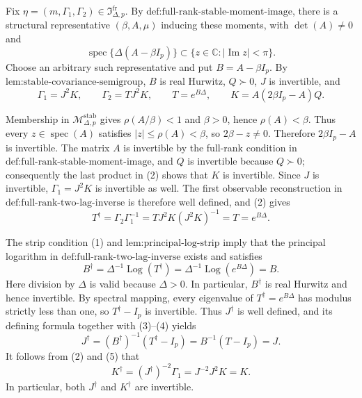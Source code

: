 Fix \(\eta=(m,\Gamma_1,\Gamma_2)\in\mathfrak I_{\Delta,p}^{\mathrm{fr}}\).  By \(\text{def:full-rank-stable-moment-image}\), there is a structural representative \((\beta,A,\mu)\) inducing these moments, with \(\det(A)\neq0\) and
\[
 \operatorname{spec}\{\Delta(A-\beta I_p)\}
 \subset\{z\in\mathbb C:|\operatorname{Im}z|<\pi\}.
\tag{1}
\]
Choose an arbitrary such representative and put \(B=A-\beta I_p\).  By \(\text{lem:stable-covariance-semigroup}\), \(B\) is real Hurwitz, \(Q\succ0\), \(J\) is invertible, and
\[
 \Gamma_1=J^2K,\qquad
 \Gamma_2=TJ^2K,\qquad
 T=e^{B\Delta},\qquad
 K=A(2\beta I_p-A)Q.
\tag{2}
\]

Membership in \(\mathcal M_{\Delta,p}^{\mathrm{stab}}\) gives \(\rho(A/\beta)<1\) and \(\beta>0\), hence \(\rho(A)<\beta\).  Thus every \(z\in\operatorname{spec}(A)\) satisfies \(|z|\leq\rho(A)<\beta\), so \(2\beta-z\neq0\).  Therefore \(2\beta I_p-A\) is invertible.  The matrix \(A\) is invertible by the full-rank condition in \(\text{def:full-rank-stable-moment-image}\), and \(Q\) is invertible because \(Q\succ0\); consequently the last product in (2) shows that \(K\) is invertible.  Since \(J\) is invertible, \(\Gamma_1=J^2K\) is invertible as well.  The first observable reconstruction in \(\text{def:full-rank-two-lag-inverse}\) is therefore well defined, and (2) gives
\[
 T^\dagger
 =\Gamma_2\Gamma_1^{-1}
 =TJ^2K(J^2K)^{-1}
 =T=e^{B\Delta}.
\tag{3}
\]

The strip condition (1) and \(\text{lem:principal-log-strip}\) imply that the principal logarithm in \(\text{def:full-rank-two-lag-inverse}\) exists and satisfies
\[
 B^\dagger
 =\Delta^{-1}\operatorname{Log}(T^\dagger)
 =\Delta^{-1}\operatorname{Log}(e^{B\Delta})
 =B.
\tag{4}
\]
Here division by \(\Delta\) is valid because \(\Delta>0\).  In particular, \(B^\dagger\) is real Hurwitz and hence invertible.  By spectral mapping, every eigenvalue of \(T^\dagger=e^{B\Delta}\) has modulus strictly less than one, so \(T^\dagger-I_p\) is invertible.  Thus \(J^\dagger\) is well defined, and its defining formula together with (3)--(4) yields
\[
 J^\dagger
 =(B^\dagger)^{-1}(T^\dagger-I_p)
 =B^{-1}(T-I_p)
 =J.
\tag{5}
\]
It follows from (2) and (5) that
\[
 K^\dagger=(J^\dagger)^{-2}\Gamma_1
 =J^{-2}J^2K=K.
\tag{6}
\]
In particular, both \(J^\dagger\) and \(K^\dagger\) are invertible.

